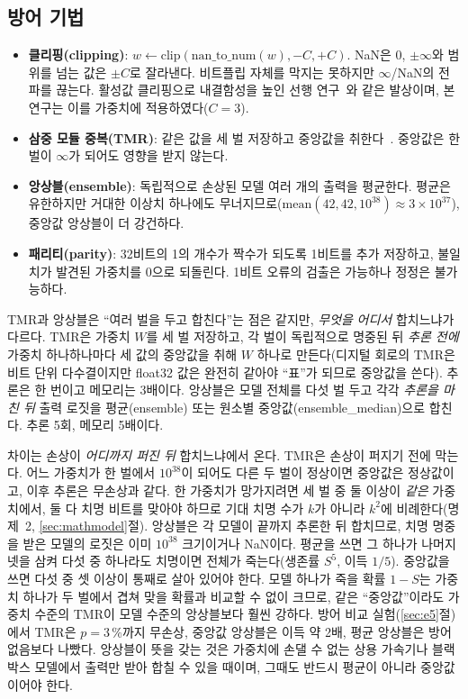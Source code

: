 \documentclass[11pt,a4paper]{article}
\newcounter{note}
\begin{document}
\subsection{방어 기법}
\begin{itemize}[leftmargin=*]
  \item \textbf{클리핑(clipping)}: $w \leftarrow \mathrm{clip}(\mathrm{nan\_to\_num}(w),-C,+C)$. NaN은 0, $\pm\infty$와 범위를 넘는 값은 $\pm C$로 잘라낸다. 비트플립 자체를 막지는 못하지만 $\infty$/NaN의 전파를 끊는다. 활성값 클리핑으로 내결함성을 높인 선행 연구~\citep{hoang2020}와 같은 발상이며, 본 연구는 이를 가중치에 적용하였다($C=3$).
  \item \textbf{삼중 모듈 중복(TMR)}: 같은 값을 세 벌 저장하고 중앙값을 취한다~\citep{lyons1962}. 중앙값은 한 벌이 $\infty$가 되어도 영향을 받지 않는다.
  \item \textbf{앙상블(ensemble)}: 독립적으로 손상된 모델 여러 개의 출력을 평균한다. 평균은 유한하지만 거대한 이상치 하나에도 무너지므로($\mathrm{mean}(42,42,10^{38})\approx3\times10^{37}$), 중앙값 앙상블이 더 강건하다.
  \item \textbf{패리티(parity)}: 32비트의 1의 개수가 짝수가 되도록 1비트를 추가 저장하고, 불일치가 발견된 가중치를 0으로 되돌린다. 1비트 오류의 검출은 가능하나 정정은 불가능하다.
\end{itemize}

\begin{note}
\label{note:tmr}
TMR과 앙상블은 ``여러 벌을 두고 합친다''는 점은 같지만, \emph{무엇을} \emph{어디서} 합치느냐가 다르다. TMR은 가중치 $W$를 세 벌 저장하고, 각 벌이 독립적으로 명중된 뒤 \emph{추론 전에} 가중치 하나하나마다 세 값의 중앙값을 취해 $W$ 하나로 만든다(디지털 회로의 TMR은 비트 단위 다수결이지만 float32 값은 완전히 같아야 ``표''가 되므로 중앙값을 쓴다). 추론은 한 번이고 메모리는 3배이다. 앙상블은 모델 전체를 다섯 벌 두고 각각 \emph{추론을 마친 뒤} 출력 로짓을 평균(ensemble) 또는 원소별 중앙값(ensemble\_median)으로 합친다. 추론 5회, 메모리 5배이다.

차이는 손상이 \emph{어디까지 퍼진 뒤} 합치느냐에서 온다. TMR은 손상이 퍼지기 전에 막는다. 어느 가중치가 한 벌에서 $10^{38}$이 되어도 다른 두 벌이 정상이면 중앙값은 정상값이고, 이후 추론은 무손상과 같다. 한 가중치가 망가지려면 세 벌 중 둘 이상이 \emph{같은} 가중치에서, 둘 다 치명 비트를 맞아야 하므로 기대 치명 수가 $k$가 아니라 $k^2$에 비례한다(명제~2, \ref{sec:mathmodel}절). 앙상블은 각 모델이 끝까지 추론한 뒤 합치므로, 치명 명중을 받은 모델의 로짓은 이미 $10^{38}$ 크기이거나 NaN이다. 평균을 쓰면 그 하나가 나머지 넷을 삼켜 다섯 중 하나라도 치명이면 전체가 죽는다(생존률 $S^5$, 이득 $1/5$). 중앙값을 쓰면 다섯 중 셋 이상이 통째로 살아 있어야 한다. 모델 하나가 죽을 확률 $1-S$는 가중치 하나가 두 벌에서 겹쳐 맞을 확률과 비교할 수 없이 크므로, 같은 ``중앙값''이라도 가중치 수준의 TMR이 모델 수준의 앙상블보다 훨씬 강하다. 방어 비교 실험(\ref{sec:e5}절)에서 TMR은 $p=3\,\%$까지 무손상, 중앙값 앙상블은 이득 약 2배, 평균 앙상블은 방어 없음보다 나빴다. 앙상블이 뜻을 갖는 것은 가중치에 손댈 수 없는 상용 가속기나 블랙박스 모델에서 출력만 받아 합칠 수 있을 때이며, 그때도 반드시 평균이 아니라 중앙값이어야 한다.
\end{note}
\end{document}
